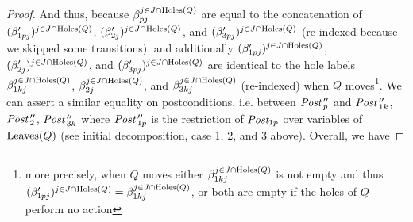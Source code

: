 \documentclass{lmcs}
\begin{document}
\begin{proof}
And thus, because $\beta_{pj}^{j\in J\cap \operatorname{Holes}(Q)}$ are equal to the concatenation of  $(\beta'_{1pj})^{j\in J\cap \operatorname{Holes}(Q)}$, $(\beta'_{2j})^{j\in J\cap \operatorname{Holes}(Q)}$, and $(\beta_{3pj}')^{j\in J\cap \operatorname{Holes}(Q)}$ (re-indexed because we skipped some transitions), and additionally $(\beta_{1pj}')^{j\in J\cap \operatorname{Holes}(Q)}$, $(\beta_{2j}')^{j\in J\cap \operatorname{Holes}(Q)}$, and $(\beta_{3pj}')^{j\in J\cap \operatorname{Holes}(Q)}$ are identical to the hole labels $\beta_{1kj}^{j\in J\cap \operatorname{Holes}(Q)}$, $\beta_{2j}^{j\in J\cap \operatorname{Holes}(Q)}$, and $\beta_{3kj}^{j\in J\cap \operatorname{Holes}(Q)}$ (re-indexed) when $Q$ moves\footnote{more precisely, when $Q$ moves either $\beta_{1kj}^{j\in J\cap \operatorname{Holes}(Q)}$ is not empty  and thus $(\beta_{1pj}')^{j\in J\cap \operatorname{Holes}(Q)}=\beta_{1kj}^{j\in J\cap \operatorname{Holes}(Q)}$, or both are empty if the holes of $Q$ perform no action}. We can assert a similar equality on postconditions, i.e. between $\Post\,''_p$ and $\Post\,''_{1k}$, $\Post\,''_{2}$, $\Post\,''_{3k}$ where $\Post\,''_{1p}$ is the restriction of $\Post_{1p}$ over variables of $\operatorname{Leaves}(Q)$ (see initial decomposition, case 1, 2, and 3 above). Overall, we have


\end{proof}
\end{document}
